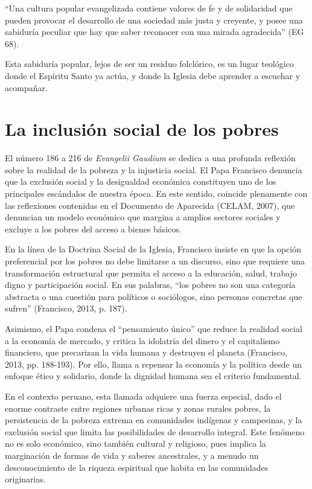 \documentclass[12pt]{article}
\begin{document}
	\begin{displayquote}
		“Una cultura popular evangelizada contiene valores de fe y de solidaridad que pueden provocar el desarrollo de una sociedad más justa y creyente, y posee una sabiduría peculiar que hay que saber reconocer con una mirada agradecida” (EG 68).
	\end{displayquote}
	
	Esta sabiduría popular, lejos de ser un residuo folclórico, es un lugar teológico donde el Espíritu Santo ya actúa, y donde la Iglesia debe aprender a escuchar y acompañar.
	
	\section{La inclusión social de los pobres}
	
	El número 186 a 216 de \textit{Evangelii Gaudium} se dedica a una profunda reflexión sobre la realidad de la pobreza y la injusticia social. El Papa Francisco denuncia que la exclusión social y la desigualdad económica constituyen uno de los principales escándalos de nuestra época. En este sentido, coincide plenamente con las reflexiones contenidas en el Documento de Aparecida (CELAM, 2007)\nocite{CELAM2007}, que denuncian un modelo económico que margina a amplios sectores sociales y excluye a los pobres del acceso a bienes básicos.
	
	En la línea de la Doctrina Social de la Iglesia, Francisco insiste en que la opción preferencial por los pobres no debe limitarse a un discurso, sino que requiere una transformación estructural que permita el acceso a la educación, salud, trabajo digno y participación social. En sus palabras, “los pobres no son una categoría abstracta o una cuestión para políticos o sociólogos, sino personas concretas que sufren” (Francisco, 2013, p. 187)\nocite{Francisco2013}.
	
	Asimismo, el Papa condena el “pensamiento único” que reduce la realidad social a la economía de mercado, y critica la idolatría del dinero y el capitalismo financiero, que precarizan la vida humana y destruyen el planeta (Francisco, 2013, pp. 188-193)\nocite{Francisco2013}. Por ello, llama a repensar la economía y la política desde un enfoque ético y solidario, donde la dignidad humana sea el criterio fundamental.
	
	En el contexto peruano, esta llamada adquiere una fuerza especial, dado el enorme contraste entre regiones urbanas ricas y zonas rurales pobres, la persistencia de la pobreza extrema en comunidades indígenas y campesinas, y la exclusión social que limita las posibilidades de desarrollo integral. Este fenómeno no es solo económico, sino también cultural y religioso, pues implica la marginación de formas de vida y saberes ancestrales, y a menudo un desconocimiento de la riqueza espiritual que habita en las comunidades originarias.
	
\end{document}
